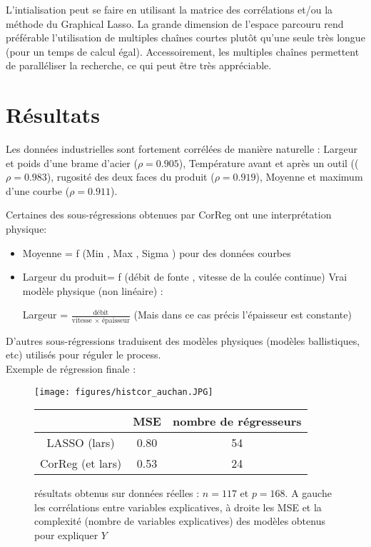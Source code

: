 \documentclass[12pt]{article}
\begin{document}
 
L'intialisation peut se faire en utilisant la matrice des corrélations et/ou la méthode du Graphical Lasso\cite{friedman2008sparse}.		
La grande dimension de l'espace parcouru rend préférable l'utilisation de multiples chaînes courtes plutôt qu'une seule très longue (pour un temps de calcul égal). Accessoirement, les multiples chaînes permettent de paralléliser la recherche, ce qui peut être très appréciable.



\section{Résultats}	
Les données industrielles sont fortement corrélées de manière naturelle : Largeur et poids d'une brame d'acier ($\rho=0.905$), Température avant et après un outil (($\rho=0.983$), rugosité des deux faces du produit ($\rho=0.919$), Moyenne et maximum d'une courbe ($\rho=0.911$).
			
Certaines des sous-régressions obtenues par CorReg ont une interprétation physique:
\begin{itemize}
	\item Moyenne = f (Min , Max , Sigma ) pour des données courbes
	\item Largeur du produit= f (débit de fonte , vitesse de la coulée continue)	
Vrai modèle physique (non linéaire) :

	 Largeur = $\frac{\textrm{débit}}{\textrm{vitesse } \times \textrm{ épaisseur}}$ (Mais dans ce cas précis l'épaisseur est constante)
			\end{itemize}
			
			D'autres sous-régressions traduisent des modèles physiques (modèles ballistiques, etc) utilisés pour réguler le process.
\\

Exemple de régression finale :
\begin{figure}[!h]
	\begin{minipage}[c]{.40\linewidth}
			\texttt{[image: figures/histcor\_auchan.JPG]} 
	\end{minipage} \hfill
   \begin{minipage}[c]{.52\linewidth}
		\begin{tabular}{|c|c|c|}
		\hline 
		  & MSE  & nombre de régresseurs  \\ 
		\hline
		LASSO (lars) & 0.80 & 54 \\ 
		\hline 
		CorReg (et lars) & 0.53 & 24  \\ 
		\hline 
		\end{tabular} 
   \end{minipage}
   \caption{résultats obtenus sur données réelles : $n=117$ et $p=168$.    A gauche les corrélations entre variables explicatives, à droite les MSE et la complexité (nombre de variables explicatives) des modèles obtenus pour expliquer $Y$ }
\end{figure}   
	
\end{document}

